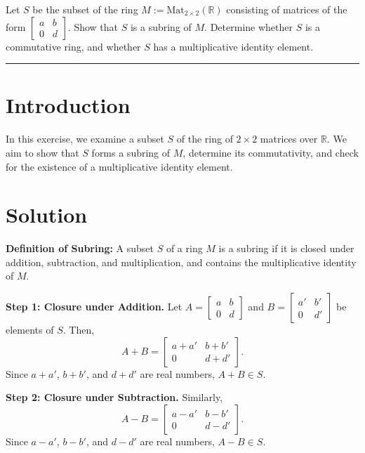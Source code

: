 \documentclass[12pt]{amsart}
\theoremstyle{definition}
\numberwithin{equation}{section}
\newcommand{\R}{\mathbb{R}}
\begin{document}
\begin{exercise}{7} Let \(S\) be the subset of the ring \(M := \text{Mat}_{2 \times 2}(\R)\) consisting of matrices of the form \(\begin{bmatrix} a & b \\ 0 & d \end{bmatrix}\). Show that \(S\) is a subring of \(M\). Determine whether \(S\) is a commutative ring, and whether \(S\) has a multiplicative identity element.

    \noindent\rule{\linewidth}{1pt}

    \section*{Introduction}
    
    In this exercise, we examine a subset \(S\) of the ring of \(2 \times 2\) matrices over \(\R \). We aim to show that \(S\) forms a subring of \(M\), determine its commutativity, and check for the existence of a multiplicative identity element.

    \section*{Solution}

    \noindent \textbf{Definition of Subring:} A subset \(S\) of a ring \(M\) is a subring if it is closed under addition, subtraction, and multiplication, and contains the multiplicative identity of \(M\).

    \noindent \textbf{Step 1: Closure under Addition.}
    Let \(A = \begin{bmatrix} a & b \\ 0 & d \end{bmatrix}\) and \(B = \begin{bmatrix} a' & b' \\ 0 & d' \end{bmatrix}\) be elements of \(S\). Then,
    \[
    A + B = \begin{bmatrix} a + a' & b + b' \\ 0 & d + d' \end{bmatrix}.
    \]
    Since \(a + a'\), \(b + b'\), and \(d + d'\) are real numbers, \(A + B \in S\).

    \noindent \textbf{Step 2: Closure under Subtraction.}
    Similarly,
    \[
    A - B = \begin{bmatrix} a - a' & b - b' \\ 0 & d - d' \end{bmatrix}.
    \]
    Since \(a - a'\), \(b - b'\), and \(d - d'\) are real numbers, \(A - B \in S\).


\end{exercise}
\end{document}

